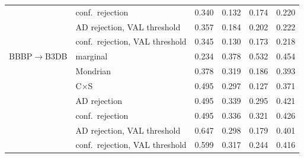 \begin{tabular}{llcccc}
 & conf.\ rejection & 0.340 & 0.132 & 0.174 & 0.220\\
 & AD rejection, VAL threshold & 0.357 & 0.184 & 0.202 & 0.222\\
 & conf.\ rejection, VAL threshold & 0.345 & 0.130 & 0.173 & 0.218\\
\midrule
BBBP$\to$B3DB & marginal & 0.234 & 0.378 & 0.532 & 0.454\\
 & Mondrian & 0.378 & 0.319 & 0.186 & 0.393\\
 & C$\times$S & 0.495 & 0.297 & 0.127 & 0.371\\
 & AD rejection & 0.495 & 0.339 & 0.295 & 0.421\\
 & conf.\ rejection & 0.495 & 0.336 & 0.321 & 0.426\\
 & AD rejection, VAL threshold & 0.647 & 0.298 & 0.179 & 0.401\\
 & conf.\ rejection, VAL threshold & 0.599 & 0.317 & 0.244 & 0.416\\
\bottomrule
\end{tabular}
